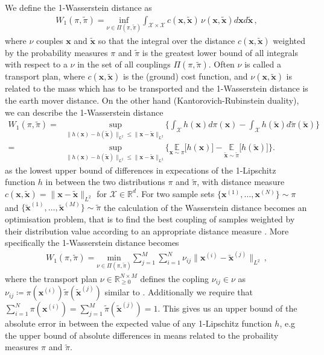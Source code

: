 We define the 1-Wasserstein distance as
\begin{align}
	W_1(\pi,\tilde{\pi}) = \underset{  \nu \in \Pi(\pi,\tilde{\pi}) }{ \text{inf}}\int_{\mathcal{X} \times \mathcal{X}} c(\bm{x},\tilde{\bm{x}}) \, \nu(\bm{x},\tilde{\bm{x}}) d\bm{x} d\tilde{\bm{x}}
	\label{eq:wass} \, ,
\end{align}
where $\nu$ couples $\bm{x}$ and $\tilde{\bm{x}}$ so that the integral over the distance $ c(\bm{x},\tilde{\bm{x}}) $ weighted by the probability measures $\pi$ and $\tilde{\pi}$ is the greatest lower bound of all integrals with respect to a $\nu$ in the set of all couplings $ \Pi(\pi,\tilde{\pi})$.
Often $\nu$ is called a transport plan, where $c(\bm{x},\tilde{\bm{x}})$ is the (ground) cost function, and $\nu(\bm{x}, \tilde{\bm{x}})$ is related to the mass which has to be transported and the 1-Wasserstein distance is the earth mover distance.
On the other hand (Kantorovich-Rubinstein duality), we can describe the 1-Wasserstein distance 
\begin{align}
	W_1(\pi,\tilde{\pi})  =& \underset{ \lVert h(\bm{x})- h(\tilde{\bm{x}}) \rVert_{L^2} \leq   \lVert \bm{x} - \tilde{\bm{x}}  \rVert_{L^2} }{ \text{sup}} \Bigg\{  \int_{\mathcal{X}} h(\bm{x}) d \pi (\bm{x})  - \int_{\mathcal{X}} h(\tilde{\bm{x}}) d \tilde{\pi} (\tilde{\bm{x}}) \Bigg\} \\
	=& \underset{ \lVert h(\bm{x})- h(\tilde{\bm{x}}) \rVert_{L^2} \leq \lVert \bm{x} -\tilde{\bm{x}}  \rVert_{L^2} }{ \text{sup}}  \Bigg\{  \underset{\bm{x} \sim  \pi }{\mathbb{E}} \big[ h(\bm{x}) \big]  -  \underset{\tilde{\bm{x}}\sim \tilde{\pi}}{\mathbb{E}} \big[ h(\tilde{\bm{x}}) \big] \Bigg\} .
\end{align}
as the lowest upper bound of differences in expecations of the 1-Lipschitz function $h$ in between the two distributions $\pi$ and $\tilde{\pi}$, with distance measure $c(\bm{x},\tilde{\bm{x}})= \lVert \bm{x} -\tilde{\bm{x}} \rVert_{L^2} $ for $\mathcal{X} \in \mathbb{R}^d$.
For two sample sets $\{ \bm{x}^{(1)},\dots,\bm{x}^{(N)}\} \sim \pi$ and $\{\tilde{ \bm{x}}^{(1)},\dots,\tilde{\bm{x}}^{(M)}\} \sim \tilde{\pi}$ the calculation of the Wasserstein distance becomes an optimisation problem, that is to find the best coupling of samples weighted by their distribution value according to an appropriate distance measure \cite{feydy2020OT}.
More specifically the 1-Wasserstein distance becomes
\begin{align}
W_1(\pi,\tilde{\pi}) = 	\underset{\nu \in \Pi(\pi,\tilde{\pi}) }{\text{min}} \sum^M_{j = 1} \sum^N_{i =1}  \nu_{ij} \lVert\bm{x}^{(i)}  -  \tilde{\bm{x}}^{(j)} \rVert_{L^2} \, , \label{eq:applWasser}
\end{align}
where the transport plan $\nu \in \mathbb{R}^{N \times M}_ {\geq 0}$ defines the copling $\nu_{ij} \in \nu $ as $ \nu_{ij} \coloneqq \pi(\bm{x}^{(i)}) \tilde{\pi}(\tilde{\bm{x}}^{(j)})$ similar to \cite[Eq. 3.166]{feydy2020OT}.
Additionally we require that $\sum^N_{i =1} \pi(\bm{x}^{(i)}) = \sum^M_{j = 1} \tilde{\pi}(\tilde{\bm{x}}^{(j)})= 1 $.
This gives us an upper bound of the absolute error in between the expected value of any 1-Lipschitz function $h$, e.g the upper bound of absolute differences in means related to the probaility measures $\pi$ and $\tilde{\pi}$. 

